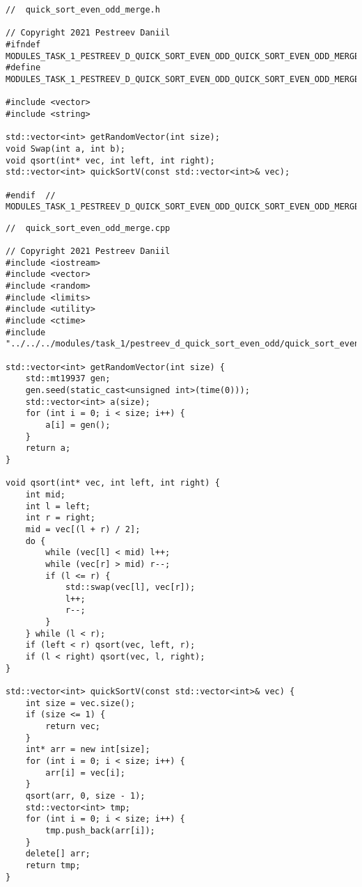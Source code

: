 \documentclass{report}
\begin{document}
\begin{lstlisting}
//  quick_sort_even_odd_merge.h

// Copyright 2021 Pestreev Daniil
#ifndef MODULES_TASK_1_PESTREEV_D_QUICK_SORT_EVEN_ODD_QUICK_SORT_EVEN_ODD_MERGE_H_
#define MODULES_TASK_1_PESTREEV_D_QUICK_SORT_EVEN_ODD_QUICK_SORT_EVEN_ODD_MERGE_H_

#include <vector>
#include <string>

std::vector<int> getRandomVector(int size);
void Swap(int a, int b);
void qsort(int* vec, int left, int right);
std::vector<int> quickSortV(const std::vector<int>& vec);

#endif  // MODULES_TASK_1_PESTREEV_D_QUICK_SORT_EVEN_ODD_QUICK_SORT_EVEN_ODD_MERGE_H_
\end{lstlisting}

\begin{lstlisting}
//  quick_sort_even_odd_merge.cpp

// Copyright 2021 Pestreev Daniil
#include <iostream>
#include <vector>
#include <random>
#include <limits>
#include <utility>
#include <ctime>
#include "../../../modules/task_1/pestreev_d_quick_sort_even_odd/quick_sort_even_odd_merge.h"

std::vector<int> getRandomVector(int size) {
    std::mt19937 gen;
    gen.seed(static_cast<unsigned int>(time(0)));
    std::vector<int> a(size);
    for (int i = 0; i < size; i++) {
        a[i] = gen();
    }
    return a;
}

void qsort(int* vec, int left, int right) {
    int mid;
    int l = left;
    int r = right;
    mid = vec[(l + r) / 2];
    do {
        while (vec[l] < mid) l++;
        while (vec[r] > mid) r--;
        if (l <= r) {
            std::swap(vec[l], vec[r]);
            l++;
            r--;
        }
    } while (l < r);
    if (left < r) qsort(vec, left, r);
    if (l < right) qsort(vec, l, right);
}

std::vector<int> quickSortV(const std::vector<int>& vec) {
    int size = vec.size();
    if (size <= 1) {
        return vec;
    }
    int* arr = new int[size];
    for (int i = 0; i < size; i++) {
        arr[i] = vec[i];
    }
    qsort(arr, 0, size - 1);
    std::vector<int> tmp;
    for (int i = 0; i < size; i++) {
        tmp.push_back(arr[i]);
    }
    delete[] arr;
    return tmp;
}

\end{lstlisting}
\end{document}
